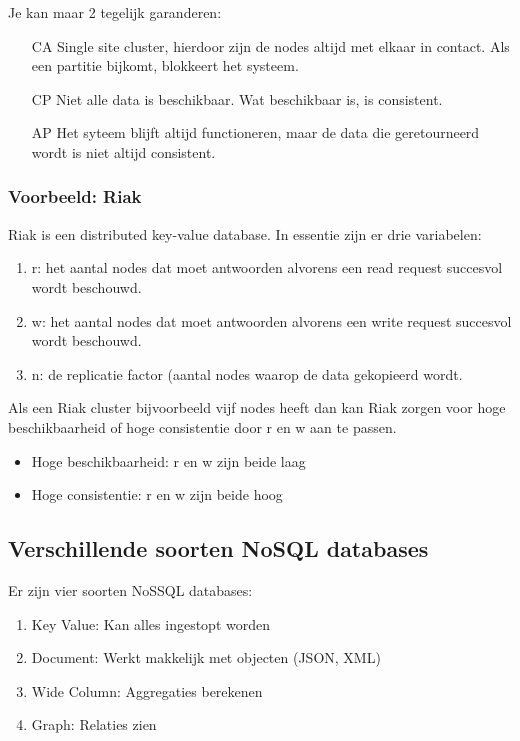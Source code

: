 \documentclass[a4paper,12pt]{article}
\begin{document}
Je kan maar 2 tegelijk garanderen:
\begin{itemize}
\item[CA] Single site cluster, hierdoor zijn de nodes altijd met elkaar in contact. Als een partitie bijkomt, blokkeert het systeem.
\item[CP] Niet alle data is beschikbaar. Wat beschikbaar is, is consistent.
\item[AP] Het syteem blijft altijd functioneren, maar de data die geretourneerd wordt is niet altijd consistent.
\end{itemize}

\subsubsection{Voorbeeld: Riak}
Riak is een distributed key-value database.
In essentie zijn er drie variabelen:
\begin{enumerate}
\item r: het aantal nodes dat moet antwoorden alvorens een read request succesvol wordt beschouwd.
\item w: het aantal nodes dat moet antwoorden alvorens een write request succesvol wordt beschouwd.
\item n: de replicatie factor (aantal nodes waarop de data gekopieerd wordt.
\end{enumerate}

Als een Riak cluster bijvoorbeeld vijf nodes heeft dan kan Riak zorgen voor hoge beschikbaarheid of hoge consistentie door r en w aan te passen.
\begin{itemize}
\item Hoge beschikbaarheid: r en w zijn beide laag
\item Hoge consistentie: r en w zijn beide hoog
\end{itemize}

\subsection{Verschillende soorten NoSQL databases}
Er zijn vier soorten NoSSQL databases:

\begin{enumerate}
\item Key Value: Kan alles ingestopt worden
\item Document: Werkt makkelijk met objecten (JSON, XML)
\item Wide Column: Aggregaties berekenen
\item Graph: Relaties zien
\end{enumerate}
\end{document}
